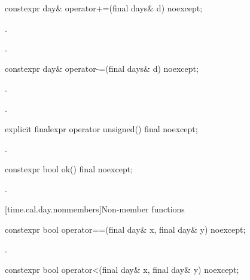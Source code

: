 %
\begin{itemdecl}
constexpr day& operator+=(final days& d) noexcept;
\end{itemdecl}

\begin{itemdescr}
\pnum
\effects {}.

\pnum
\returns {}.
\end{itemdescr}

%
\begin{itemdecl}
constexpr day& operator-=(final days& d) noexcept;
\end{itemdecl}

\begin{itemdescr}
\pnum
\effects {}.

\pnum
\returns {}.
\end{itemdescr}

%
\begin{itemdecl}
explicit finalexpr operator unsigned() final noexcept;
\end{itemdecl}

\begin{itemdescr}
\pnum
\returns {}.
\end{itemdescr}

%
\begin{itemdecl}
constexpr bool ok() final noexcept;
\end{itemdecl}

\begin{itemdescr}
\pnum
\returns {}.
\end{itemdescr}

[time.cal.day.nonmembers]{Non-member functions}

%
\begin{itemdecl}
constexpr bool operator==(final day& x, final day& y) noexcept;
\end{itemdecl}

\begin{itemdescr}
\pnum
\returns {}.
\end{itemdescr}

%
\begin{itemdecl}
constexpr bool operator<(final day& x, final day& y) noexcept;
\end{itemdecl}

